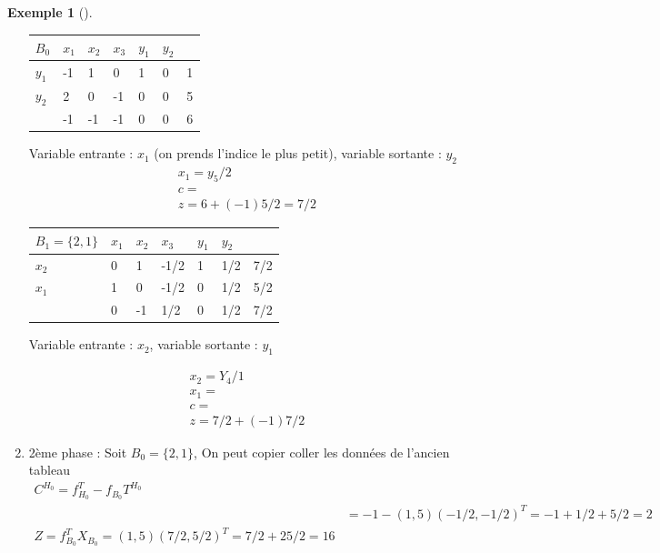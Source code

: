 \documentclass{article}
\theoremstyle{plain}%
\theoremstyle{definition}
\newtheorem{exmp}{Exemple}[section]
\theoremstyle{remark}
\begin{document}
\begin{exmp}[]
\begin{enumerate}
        \begin{table}[!h]
            \centering
            \begin{tabular}{|l|l|l|l|l|l|l|}
            \hline
                $B_0$ & $x_1$ & $x_2$ & $x_3$ & $y_1$ & $y_2$ & ~ \\ \hline
                $y_1$ & -1 & 1 & 0 & 1 & 0 & 1 \\ \hline
                $y_2$ & 2 & 0 & -1 & 0 & 0 & 5 \\ \hline
                ~ & -1 & -1 & -1 & 0 & 0 & 6 \\ \hline
            \end{tabular}
        \end{table}

        Variable entrante : $ x_1 $ (on prends l'indice le plus petit), variable sortante : $ y_2 $ 
        \begin{align*}
            x_1 = y_5 /2 \\
            c = \\
            z = 6 + (-1)5/2 = 7/2
        \end{align*}

        \begin{table}[!h]
            \centering
            \begin{tabular}{|l|l|l|l|l|l|l|}
            \hline
                $B_1 = \{2,1\}$ & $x_1$ & $x_2$ & $x_3$ & $y_1$ & $y_2$ & ~ \\ \hline
                $x_2$ & 0 & 1 & -1/2 & 1 & 1/2 & 7/2 \\ \hline
                $x_1$ & 1 & 0 & -1/2 & 0 & 1/2 & 5/2 \\ \hline
                ~ & 0 & -1 & 1/2 & 0 & 1/2 & 7/2 \\ \hline
            \end{tabular}
        \end{table}
        Variable entrante : $ x_2 $, variable sortante : $ y_1 $ 

        \begin{align*}
            x_2 = Y_4 /1 \\
            x_1 = \\
            c = \\
            z = 7/2 + (-1) 7/2
        \end{align*}
        
        \item 2ème phase : Soit $ B_0 = \{2,1\} $, On peut copier coller les données de l'ancien tableau
        \begin{align*}
            C^{H_0} = f_{H_0} ^T - f_{B_0} T ^{H_0} \\
                    &= -1 - (1, 5) (-1/2, -1/2)^T = -1 + 1/2 + 5/2 = 2 \\
            Z = f_{B_0}^T X_{B_0} = (1, 5) (7/2, 5/2)^T = 7/2 + 25/2 = 16 
        \end{align*}
        

\end{enumerate}
\end{exmp}
\end{document}
